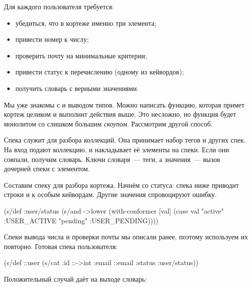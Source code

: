 Для каждого пользователя требуется:

\begin{itemize}

\item
  убедиться, что в кортеже именно три элемента;

\item
  привести номер к числу;

\item
  проверить почту на минимальные критерии;

\item
  привести статус к перечислению (одному из кейвордов);

\item
  получить словарь с верными значениями.

\end{itemize}

Мы уже знакомы с  и выводом типов. Можно написать функцию,
которая примет кортеж целиком и выполнит действия выше. Это несложно, но функция
будет монолитом со слишком большим \emph{скоупом}. Рассмотрим другой способ.


Спека  служит для разбора коллекций. Она принимает набор тегов и
других спек. На вход подают коллекцию, и  накладывает её элементы на
спеки. Если они совпали, получим словарь. Ключи словаря~--- теги, а значения~---
вызов дочерней спеки с элементом.

Составим спеку для разбора кортежа. Начнём со статуса: спека ниже приводит
строки  и  к особым кейвордам. Другие значения
спровоцируют ошибку.


\begin{clojure}
(s/def :user/status
  (s/and ->lower
         (with-conformer [val]
           (case val
             "active"  :USER_ACTIVE
             "pending" :USER_PENDING))))
\end{clojure}


Спеки вывода числа  и проверки почты  мы описали
ранее, поэтому используем их повторно. Готовая спека пользователя:


\begin{clojure}
(s/def ::user
  (s/cat :id ::->int
         :email ::email
         :status :user/status))
\end{clojure}


\noindent
Положительный случай даёт на выходе словарь:

